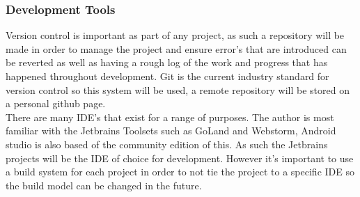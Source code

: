 \subsubsection{Development Tools}
Version control is important as part of any project, as such a repository will be made in order to manage the project and ensure error's that are introduced can be reverted as well as having a rough log of the work and progress that has happened throughout development. Git is the current industry standard for version control so this system will be used, a remote repository will be stored on a personal github page.\\

There are many IDE's that exist for a range of purposes. The author is most familiar with the Jetbrains Toolsets such as GoLand and Webstorm, Android studio is also based of the community edition of this. As such the Jetbrains projects will be the IDE of choice for development. However it's important to use a build system for each project in order to not tie the project to a specific IDE so the build model can be changed in the future.


